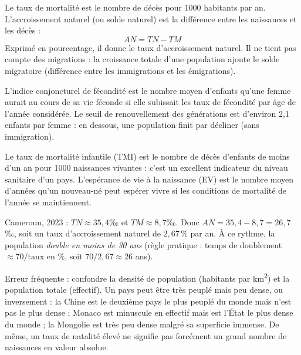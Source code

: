 \documentclass[11pt]{article}
\newcommand{\cle}[1]{{\popxbold\color{popdark}#1}}
\begin{document}
\begin{definition}
Le \cle{taux de mortalité} est le nombre de décès pour 1000 habitants par an. L'\cle{accroissement naturel} (ou solde naturel) est la différence entre les naissances et les décès :
\[ AN = TN - TM \]
Exprimé en pourcentage, il donne le \cle{taux d'accroissement naturel}. Il ne tient pas compte des migrations : la croissance totale d'une population ajoute le \cle{solde migratoire} (différence entre les immigrations et les émigrations).
\end{definition}

\begin{definition}
L'\cle{indice conjoncturel de fécondité} est le nombre moyen d'enfants qu'une femme aurait au cours de sa vie féconde si elle subissait les taux de fécondité par âge de l'année considérée. Le \cle{seuil de renouvellement des générations} est d'environ 2,1 enfants par femme : en dessous, une population finit par décliner (sans immigration).
\end{definition}

\begin{definition}
Le \cle{taux de mortalité infantile} (TMI) est le nombre de décès d'enfants de moins d'un an pour 1000 naissances vivantes : c'est un excellent indicateur du niveau sanitaire d'un pays. L'\cle{espérance de vie à la naissance} (EV) est le nombre moyen d'années qu'un nouveau-né peut espérer vivre si les conditions de mortalité de l'année se maintiennent.
\end{definition}

\begin{exemplebox}
Cameroun, 2023 : $TN \approx 35,4$‰ et $TM \approx 8,7$‰. Donc $AN = 35,4 - 8,7 = 26,7$‰, soit un taux d'accroissement naturel de $2,67\,\%$ par an. À ce rythme, la population \emph{double en moins de 30 ans} (règle pratique : temps de doublement $\approx 70 / \text{taux en \%}$, soit $70/2,67 \approx 26$ ans).
\end{exemplebox}

\begin{attention}
Erreur fréquente : confondre la \cle{densité de population} (habitants par km\textsuperscript{2}) et la \cle{population totale} (effectif). Un pays peut être très peuplé mais peu dense, ou inversement : la Chine est le deuxième pays le plus peuplé du monde mais n'est pas le plus dense ; Monaco est minuscule en effectif mais est l'État le plus dense du monde ; la Mongolie est très peu dense malgré sa superficie immense. De même, un taux de natalité élevé ne signifie pas forcément un grand nombre de naissances en valeur absolue.
\end{attention}
\end{document}

